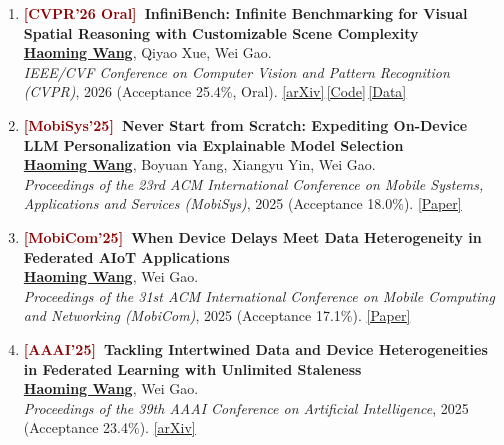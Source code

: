 \documentclass[11pt, letterpaper]{article}
\newenvironment{publist}{
  \begin{enumerate}[leftmargin=1.7em, itemsep=4pt, parsep=0pt, topsep=2pt,
                    label=\arabic*., ref=\arabic*, series=pubs]
}{\end{enumerate}}
\newcommand{\impactbullet}[1]{%
  \par\vspace{1pt}%
  \begin{itemize}[leftmargin=1.2em, topsep=0pt, itemsep=0pt, parsep=0pt, partopsep=0pt]
    \item #1
  \end{itemize}}
\newcommand{\me}{\underline{\textbf{Haoming Wang}}}
\begin{document}
\begin{publist}
\item\label{pub:infinibench} \textbf{\textcolor{darkred}{[CVPR'26 Oral]}\ InfiniBench: Infinite Benchmarking for Visual Spatial Reasoning with Customizable Scene Complexity}\\
\me, Qiyao Xue, Wei Gao.\\
\textit{IEEE/CVF Conference on Computer Vision and Pattern Recognition (CVPR)}, 2026 (Acceptance 25.4\%, Oral). \href{https://arxiv.org/abs/2511.18200}{[arXiv]}\,\href{https://github.com/pittisl/infinibench}{[Code]}\,\href{https://huggingface.co/datasets/Haoming645/infinibench}{[Data]}

\item\label{pub:xpert} \textbf{\textcolor{darkred}{[MobiSys'25]}\ Never Start from Scratch: Expediting On-Device LLM Personalization via Explainable Model Selection}\\
\me, Boyuan Yang, Xiangyu Yin, Wei Gao.\\
\textit{Proceedings of the 23rd ACM International Conference on Mobile Systems, Applications and Services (MobiSys)}, 2025 (Acceptance 18.0\%). \href{https://haomingwang645.github.io/pdfs/xpert_paper.pdf}{[Paper]}

\item\label{pub:feddc} \textbf{\textcolor{darkred}{[MobiCom'25]}\ When Device Delays Meet Data Heterogeneity in Federated AIoT Applications}\\
\me, Wei Gao.\\
\textit{Proceedings of the 31st ACM International Conference on Mobile Computing and Networking (MobiCom)}, 2025 (Acceptance 17.1\%). \href{https://haomingwang645.github.io/pdfs/feddc_paper.pdf}{[Paper]}

\item\label{pub:aaai} \textbf{\textcolor{darkred}{[AAAI'25]}\ Tackling Intertwined Data and Device Heterogeneities in Federated Learning with Unlimited Staleness}\\
\me, Wei Gao.\\
\textit{Proceedings of the 39th AAAI Conference on Artificial Intelligence}, 2025 (Acceptance 23.4\%). \href{https://arxiv.org/abs/2309.13536}{[arXiv]}
\end{publist}
\end{document}
